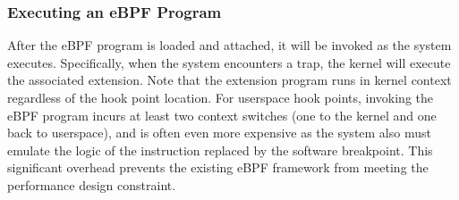 
\subsubsection{Executing an eBPF Program}

After the eBPF program is loaded and attached, it will be invoked as the system executes.  Specifically, when the system encounters a trap, the kernel will execute the associated extension.   Note that the extension program runs in kernel context regardless of the hook point location. For userspace hook points, invoking the eBPF program incurs at least two context switches (one to the kernel and one back to userspace), and is often even more expensive as the system also must emulate the logic of the instruction replaced by the software breakpoint.  This significant overhead  prevents the existing eBPF framework from meeting the performance design constraint.



